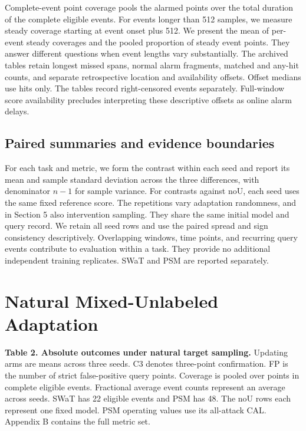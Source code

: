 \documentclass[
  american,
]{article}
\begin{document}
Complete-event point coverage pools the alarmed points over the total
duration of the complete eligible events. For events longer than 512
samples, we measure steady coverage starting at event onset plus 512. We
present the mean of per-event steady coverages and the pooled proportion
of steady event points. They answer different questions when event
lengths vary substantially. The archived tables retain longest missed
spans, normal alarm fragments, matched and any-hit counts, and separate
retrospective location and availability offsets. Offset medians use hits
only. The tables record right-censored events separately. Full-window
score availability precludes interpreting these descriptive offsets as
online alarm delays.

\subsection{Paired summaries and evidence
boundaries}\label{paired-summaries-and-evidence-boundaries}

For each task and metric, we form the contrast within each seed and
report its mean and sample standard deviation across the three
differences, with denominator \(n-1\) for sample variance. For contrasts
against noU, each seed uses the same fixed reference score. The
repetitions vary adaptation randomness, and in Section 5 also
intervention sampling. They share the same initial model and query
record. We retain all seed rows and use the paired spread and sign
consistency descriptively. Overlapping windows, time points, and
recurring query events contribute to evaluation within a task. They
provide no additional independent training replicates. SWaT and PSM are
reported separately.

\section{Natural Mixed-Unlabeled
Adaptation}\label{natural-mixed-unlabeled-adaptation}

\textbf{Table 2. Absolute outcomes under natural target sampling.}
Updating arms are means across three seeds. C3 denotes three-point
confirmation. FP is the number of strict false-positive query points.
Coverage is pooled over points in complete eligible events. Fractional
average event counts represent an average across seeds. SWaT has 22
eligible events and PSM has 48. The noU rows each represent one fixed
model. PSM operating values use its all-attack CAL. Appendix B contains
the full metric set.
\end{document}
